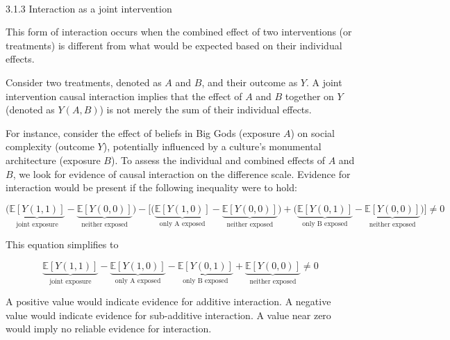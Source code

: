\documentclass[
  singlecolumn]{article}
\makeatletter
\let\oldparagraph\paragraph
\renewcommand{\paragraph}{
    \@ifstar
      \xxxParagraphStar
      \xxxParagraphNoStar
  }
\newcommand{\xxxParagraphStar}[1]{\oldparagraph*{#1}\mbox{}}
\newcommand{\xxxParagraphNoStar}[1]{\oldparagraph{#1}\mbox{}}
\makeatother
\begin{document}
\paragraph{3.1.3 Interaction as a joint
intervention}\label{interaction-as-a-joint-intervention}

This form of interaction occurs when the combined effect of two
interventions (or treatments) is different from what would be expected
based on their individual effects.

Consider two treatments, denoted as \(A\) and \(B\), and their outcome
as \(Y\). A joint intervention causal interaction implies that the
effect of \(A\) and \(B\) together on \(Y\) (denoted as \(Y(A,B)\)) is
not merely the sum of their individual effects.

For instance, consider the effect of beliefs in Big Gods (exposure
\(A\)) on social complexity (outcome \(Y\)), potentially influenced by a
culture's monumental architecture (exposure \(B\)). To assess the
individual and combined effects of \(A\) and \(B\), we look for evidence
of causal interaction on the difference scale. Evidence for interaction
would be present if the following inequality were to hold:

\[\bigg(\underbrace{\mathbb{E}[Y(1,1)]}_{\text{joint exposure}} - \underbrace{\mathbb{E}[Y(0,0)]}_{\text{neither exposed}}\bigg) - \bigg[ \bigg(\underbrace{\mathbb{E}[Y(1,0)]}_{\text{only A exposed}} - \underbrace{\mathbb{E}[Y(0,0)]}_{\text{neither exposed}}\bigg) + \bigg(\underbrace{\mathbb{E}[Y(0,1)]}_{\text{only B exposed}} - \underbrace{\mathbb{E}[Y(0,0)]}_{\text{neither exposed}} \bigg)\bigg] \neq 0 \]

This equation simplifies to

\[ \underbrace{\mathbb{E}[Y(1,1)]}_{\text{joint exposure}} - \underbrace{\mathbb{E}[Y(1,0)]}_{\text{only A exposed}} - \underbrace{\mathbb{E}[Y(0,1)]}_{\text{only B exposed}} + \underbrace{\mathbb{E}[Y(0,0)]}_{\text{neither exposed}} \neq 0 \]

A positive value would indicate evidence for additive interaction. A
negative value would indicate evidence for sub-additive interaction. A
value near zero would imply no reliable evidence for interaction.
\end{document}
